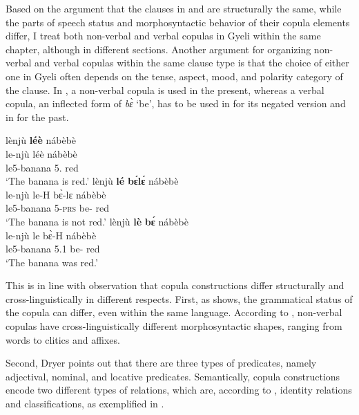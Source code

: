 Based on the argument that the clauses in  and  are structurally the same, while the parts of speech status and morphosyntactic behavior of their copula elements differ, I treat both non-verbal and verbal copulas in Gyeli within the same chapter, although in different sections. Another argument for organizing non-verbal and verbal copulas within the same clause type is that the choice of either one in Gyeli often depends on the tense, aspect, mood, and polarity category of the clause. In , a non-verbal copula is used in the present, whereas a verbal copula, an inflected form of {\itshape bɛ̀} `be', has to be used in  for its negated version and in  for the past.

\ea\label{banana}
\ea \label{banana1}
  \glll lènjù {\bfseries léè} nábèbè   \\
        le-njù léè nábèbè  \\
          le5-banana 5.{\COP} red\\
    \trans `The banana is red.'
\ex\label{banana2}
  \glll lènjù {\bfseries lé} {\bfseries bɛ́lɛ́} nábèbè   \\
        le-njù le-H bɛ̀-lɛ nábèbè  \\
          le5-banana 5-\textsc{prs} be-{\NEG} red\\
    \trans `The banana is not red.'
\ex\label{banana3}
  \glll lènjù {\bfseries lè} {\bfseries bɛ́} nábèbè   \\
        le-njù le bɛ̀-H nábèbè  \\
          le5-banana 5.{\PST}1 be-{\R} red\\
    \trans `The banana was red.'
\z
\z

This is in line with  observation that copula constructions differ structurally and cross-linguistically in different respects. First, as  shows, the grammatical status of the copula can differ, even within the same language. According to \citet[225-227]{dryer2007a}, non-verbal copulas have cross-linguistically different morphosyntactic shapes, ranging from words to clitics and affixes.

Second, Dryer points out that there are three types of predicates, namely adjectival, nominal, and locative predicates. 
Semantically, copula constructions encode two different types of relations, which are, according to \citet[1-2]{curnow2001}, identity relations and classifications, as exemplified in .


